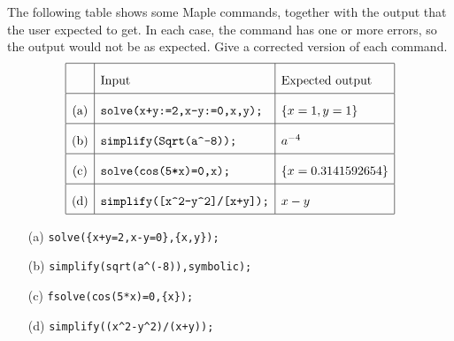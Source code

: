 \documentclass[a4paper]{article}
\begin{document}
\begin{problem}\label{ex-error-iii}
 The following table shows some Maple commands, together
 with the output that the user expected to get.  In each
 case, the command has one or more errors, so the output
 would not be as expected.  Give a corrected version of each
 command.   
 \[ \renewcommand{\arraystretch}{2}
    \begin{array}{|c|l|l|}
     \hline
      & \text{Input} & \text{Expected output} \\ \hline
      \text{(a)} &
      \verb~solve(x+y:=2,x-y:=0,x,y);~ &
      \{x=1,y=1\} \\ \hline
      \text{(b)} &
      \verb~simplify(Sqrt(a^-8));~ &
      a^{-4} \\ \hline
      \text{(c)} &
      \verb~solve(cos(5*x)=0,x);~ &
      \{x = 0.3141592654\} \\ \hline
      \text{(d)} &
      \verb~simplify([x^2-y^2]/[x+y]);~ &
      x-y \\ \hline
    \end{array}
 \]
\end{problem}
\begin{solution}
 \begin{itemize}
  \item[(a)] \verb~solve({x+y=2,x-y=0},{x,y});~      \hspace{2em}
  \item[(b)] \verb~simplify(sqrt(a^(-8)),symbolic);~ \hspace{2em}
  \item[(c)] \verb~fsolve(cos(5*x)=0,{x});~          \hspace{2em}
  \item[(d)] \verb~simplify((x^2-y^2)/(x+y));~       \hspace{2em}\mk
 \end{itemize}
\end{solution}
\end{document}

